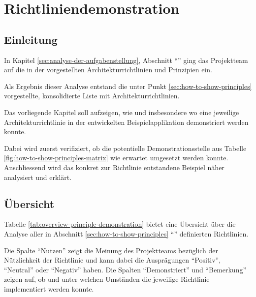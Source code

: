 \chapter{Richtliniendemonstration}
\label{sec:principle-demonstration}

\section*{Einleitung}

In Kapitel \ref{sec:analyse-der-aufgabenstellung}, Abschnitt ``'' ging das Projektteam auf die in der  vorgestellten Architekturrichtlinien und Prinzipien ein.

Als Ergebnis dieser Analyse entstand die unter Punkt \ref{sec:how-to-show-principles} vorgestellte, konsolidierte Liste mit Architekturrichtlinien.

Das vorliegende Kapitel soll aufzeigen, wie und insbesondere wo eine jeweilige Architekturrichtlinie in der entwickelten Beispielapplikation demonstriert werden konnte.

Dabei wird zuerst verifiziert, ob die potentielle Demonstrationsstelle aus Tabelle \ref{fig:how-to-show-principles-matrix} wie erwartet umgesetzt werden konnte.
Anschliessend wird das konkret zur Richtlinie entstandene Beispiel näher analysiert und erklärt.

\newpage
\section{Übersicht}

Tabelle \ref{tab:overview-principle-demonstration} bietet eine Übersicht über die Analyse aller in Abschnitt \ref{sec:how-to-show-principles} ``'' definierten Richtlinien.


Die Spalte ``Nutzen'' zeigt die Meinung des Projektteams bezüglich der Nützlichkeit der Richtlinie und kann dabei die Ausprägungen ``Positiv'', ``Neutral'' oder ``Negativ'' haben.
Die Spalten ``Demonstriert'' und ``Bemerkung'' zeigen auf, ob und unter welchen Umständen die jeweilige Richtlinie implementiert werden konnte.

